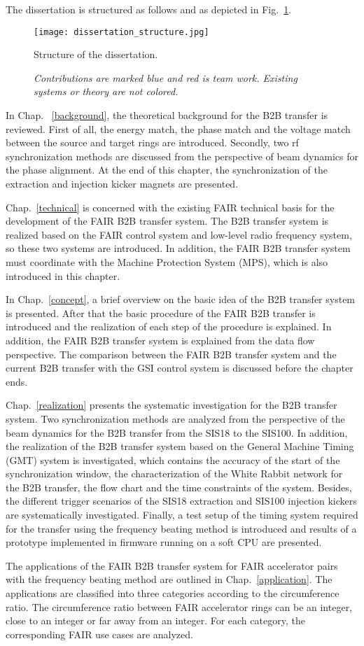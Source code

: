 The dissertation is structured as follows and as depicted in Fig.~\ref{dissertation_structure}.
\begin{figure}[!htb]
   \centering   
   \texttt{[image: dissertation\_structure.jpg]}
   \caption{Structure of the dissertation.}
	\caption*{\textsl{\small{Contributions are marked blue and red is team work. Existing systems or theory are not colored.}}}
   \label{dissertation_structure}
\end{figure}

In Chap. ~\ref{background}, the theoretical background for the B2B transfer is reviewed. First of all, the energy match, the phase match and the voltage match between the source and target rings are introduced. Secondly, two rf synchronization methods are discussed from the perspective of beam dynamics for the phase alignment. At the end of this chapter, the synchronization of the extraction and injection kicker magnets are presented.

Chap.~\ref{technical} is concerned with the existing FAIR technical basis for the development of the FAIR B2B transfer system. The B2B transfer system is realized based on the FAIR control system and low-level radio frequency system, so these two systems are introduced. In addition, the FAIR B2B transfer system must coordinate with the Machine Protection System (MPS), which is also introduced in this chapter.  

In Chap.~\ref{concept}, a brief overview on the basic idea of the B2B transfer system is presented. After that the basic procedure of the FAIR B2B transfer is introduced and the realization of each step of the procedure is explained. In addition, the FAIR B2B transfer system is explained from the data flow perspective. The comparison between the FAIR B2B transfer system and the current B2B transfer with the GSI control system is discussed before the chapter ends. 

Chap.~\ref{realization} presents the systematic investigation for the B2B transfer system. Two synchronization methods are analyzed from the perspective of the beam dynamics for the B2B transfer from the SIS18 to the SIS100. In addition, the realization of the B2B transfer system based on the General Machine Timing (GMT) system is investigated, which contains the accuracy of the start of the synchronization window, the characterization of the White Rabbit network for the B2B transfer, the flow chart and the time constraints of the system. Besides, the different trigger scenarios of the SIS18 extraction and SIS100 injection kickers are systematically investigated. Finally, a test setup of the timing system required for the transfer using the frequency beating method is introduced and results of a prototype implemented in firmware running on a soft CPU are presented.

The applications of the FAIR B2B transfer system for FAIR accelerator pairs with the frequency beating method are outlined in Chap.~\ref{application}. The applications are classified into three categories according to the circumference ratio. The circumference ratio between FAIR accelerator rings can be an integer, close to an integer or far away from an integer. For each category, the corresponding FAIR use cases are analyzed. 
